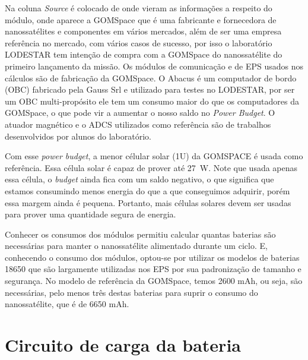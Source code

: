 Na coluna \textit{Source} é colocado de onde vieram as informações a respeito do módulo, onde aparece a GOMSpace que é uma fabricante e fornecedora de nanossatélites e componentes em vários mercados, além de ser uma empresa referência no mercado, com vários casos de sucesso, por isso o laboratório LODESTAR tem intenção de compra com a GOMSpace do nanossatélite do primeiro lançamento da missão. Os módulos de comunicação \cite{comms_gomspace_datasheet} e de EPS \cite{eps_gomspace_datasheet} usados nos cálculos são de fabricação da GOMSpace. O Abacus \cite{gauss_obc_datasheet} é um computador de bordo (OBC) fabricado pela Gauss Srl e utilizado para testes no LODESTAR, por ser um OBC multi-propósito ele tem um consumo maior do que os computadores da GOMSpace, o que pode vir a aumentar o nosso saldo no \textit{Power Budget}. O atuador magnético \cite{unb_mag_actuator} e o ADCS \cite{carol_adcs} utilizados como referência são de trabalhos desenvolvidos por alunos do laboratório. 


Com esse \textit{power budget}, a menor célular solar (1U) da GOMSPACE é usada como referência. Essa célula solar é capaz de prover até \SI{27}{\watt}. Note que usada apenas essa célula, o \textit{budget} ainda fica com um saldo negativo, o que significa que estamos consumindo menos energia do que a que conseguimos adquirir, porém essa margem ainda é pequena. Portanto, mais células solares devem ser usadas para prover uma quantidade segura de energia.

Conhecer os consumos dos módulos permitiu calcular quantas baterias são necessárias para manter o nanossatélite alimentado durante um ciclo. E, conhecendo o consumo dos módulos, optou-se por utilizar os modelos de baterias 18650 que são largamente utilizadas nos EPS por sua padronização de tamanho e segurança. No modelo de referência da GOMSpace, temos 2600 mAh, ou seja, são necessárias, pelo menos três destas baterias para suprir o consumo do nanossatélite, que é de 6650 mAh.


\section{Circuito de carga da bateria}

